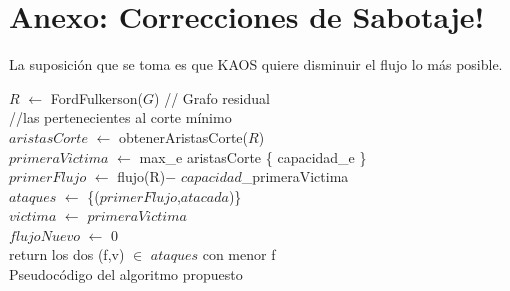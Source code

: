 \documentclass{article}
\begin{document}
\part{Anexo: Correcciones de Sabotaje!}
La suposición que se toma es que KAOS quiere disminuir el flujo lo más posible.
\begin{algorithm}
    \BlankLine

    $R$ $\leftarrow$ FordFulkerson($G$) // Grafo residual \\
    //las pertenecientes al corte mínimo \\
    $aristasCorte$ $\leftarrow$ obtenerAristasCorte($R$) \\
    $primeraVictima$ $\leftarrow$ max_{e \in aristasCorte} \{ capacidad_e \} \\
    $primerFlujo$ $\leftarrow$ flujo(R)$-$ $capacidad$_{primeraVictima} \\
    $ataques$ $\leftarrow$ \{($primerFlujo$,$atacada$)\}\\
    $victima$ $\leftarrow$ $primeraVictima$ \\
    \BlankLine
    $flujoNuevo$ $\leftarrow$ 0\\
    \BlankLine
    return los dos (f,v) $\in$ $ataques$ con menor f \\

    \caption{Pseudocódigo del algoritmo propuesto}
\end{algorithm}
\end{document}
